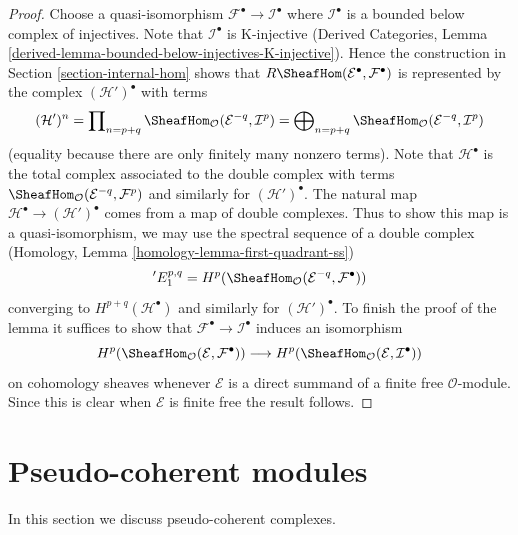 \begin{proof}
Choose a quasi-isomorphism $\mathcal{F}^\bullet \to \mathcal{I}^\bullet$
where $\mathcal{I}^\bullet$ is a bounded below complex of injectives.
Note that $\mathcal{I}^\bullet$ is K-injective
(Derived Categories, Lemma
\ref{derived-lemma-bounded-below-injectives-K-injective}).
Hence the construction in Section \ref{section-internal-hom}
shows that
$R\SheafHom(\mathcal{E}^\bullet, \mathcal{F}^\bullet)$ is 
represented by the complex $(\mathcal{H}')^\bullet$ with terms
$$
(\mathcal{H}')^n =
\prod\nolimits_{n = p + q}
\SheafHom_\mathcal{O}(\mathcal{E}^{-q}, \mathcal{I}^p) =
\bigoplus\nolimits_{n = p + q}
\SheafHom_\mathcal{O}(\mathcal{E}^{-q}, \mathcal{I}^p)
$$
(equality because there are only finitely many nonzero terms).
Note that $\mathcal{H}^\bullet$ is the total complex associated to
the double complex with terms
$\SheafHom_\mathcal{O}(\mathcal{E}^{-q}, \mathcal{F}^p)$
and similarly for $(\mathcal{H}')^\bullet$.
The natural map $\mathcal{H}^\bullet \to (\mathcal{H}')^\bullet$
comes from a map of double complexes.
Thus to show this map is a quasi-isomorphism, we may use the spectral
sequence of a double complex
(Homology, Lemma \ref{homology-lemma-first-quadrant-ss})
$$
{}'E_1^{p, q} =
H^p(\SheafHom_\mathcal{O}(\mathcal{E}^{-q}, \mathcal{F}^\bullet))
$$
converging to $H^{p + q}(\mathcal{H}^\bullet)$ and similarly for
$(\mathcal{H}')^\bullet$. To finish the proof of the lemma it
suffices to show that $\mathcal{F}^\bullet \to \mathcal{I}^\bullet$
induces an isomorphism
$$
H^p(\SheafHom_\mathcal{O}(\mathcal{E}, \mathcal{F}^\bullet))
\longrightarrow
H^p(\SheafHom_\mathcal{O}(\mathcal{E}, \mathcal{I}^\bullet))
$$
on cohomology sheaves whenever $\mathcal{E}$ is a direct summand of a
finite free $\mathcal{O}$-module. Since this is clear when $\mathcal{E}$
is finite free the result follows.
\end{proof}









\section{Pseudo-coherent modules}
\label{section-pseudo-coherent}

\noindent
In this section we discuss pseudo-coherent complexes.

